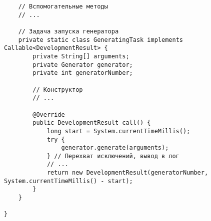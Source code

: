 \begin{verbatim}
    // Вспомогательные методы
    // ...
    
    // Задача запуска генератора
    private static class GeneratingTask implements Callable<DevelopmentResult> {
        private String[] arguments;
        private Generator generator;
        private int generatorNumber;
        
        // Конструктор
        // ...
        
        @Override
        public DevelopmentResult call() {
            long start = System.currentTimeMillis();
            try {
                generator.generate(arguments);
            } // Перехват исключений, вывод в лог
            // ...
            return new DevelopmentResult(generatorNumber, System.currentTimeMillis() - start);
        }
    }
    
}
\end{verbatim}


